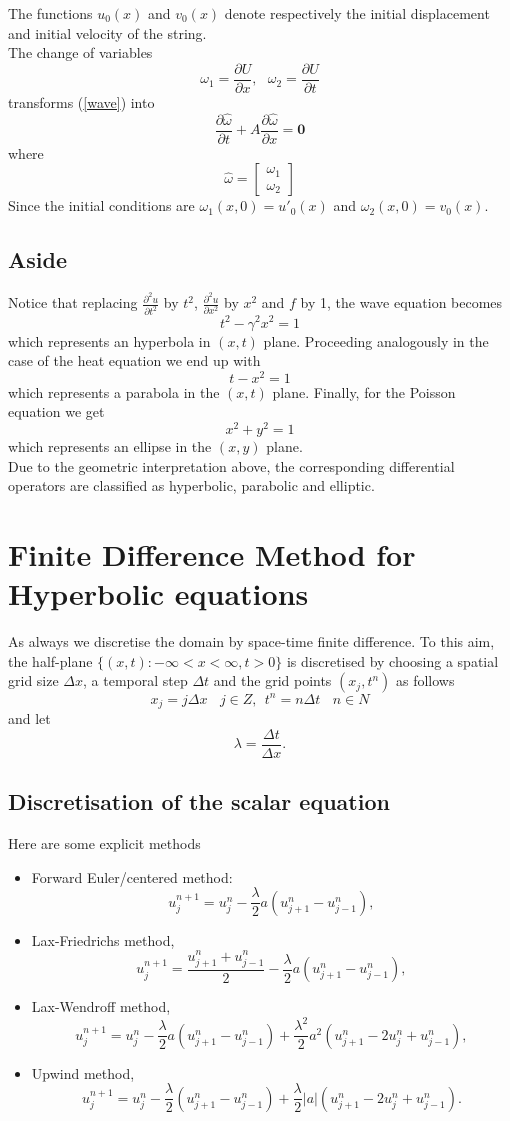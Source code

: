 The functions $u_0(x)$ and $v_0(x)$ denote respectively the initial displacement and initial velocity of the string.\\
The change of variables
\[\omega_1=\frac{\partial U}{\partial x}, \ \ \ \omega_2 =\frac{\partial U}{\partial t} \]
transforms (\ref{wave}) into 
\[
\frac{\partial \hat{\omega}}{\partial t} +A\frac{\partial \hat{\omega}}{\partial x}= \mathbf{0}
\]
where
\[\hat{\omega}=\left[\begin{array}{c}\omega_1\\ \omega_2\end{array} \right] \]
Since the initial conditions are $\omega_1(x,0)=u'_0(x)$ and $\omega_2(x,0)=v_0(x)$.\\
\subsection*{Aside}
Notice that replacing $\frac{\partial^2 u}{\partial t^2}$ by $t^2$, $\frac{\partial^2u}{\partial x^2}$ by $x^2$ and $f$ by 1, the wave equation becomes
\[t^2-\gamma^2 x^2=1 \]
which represents an hyperbola in $(x,t)$ plane. Proceeding analogously in the case
of the heat equation we end up with 
\[t-x^2=1 \]
which represents a parabola in the $(x,t)$ plane. Finally, for the Poisson
equation we get
\[x^2+y^2=1 \]
which represents an ellipse in the $(x,y)$ plane.\\
Due to the geometric interpretation above, the corresponding differential
operators are classified as hyperbolic, parabolic and elliptic.
\section{Finite Difference Method for Hyperbolic equations}
As always we discretise the domain by space-time finite difference.  To this aim,
the half-plane $\{(x,t): -\infty <x<\infty, t>0 \}$ is discretised by choosing
a spatial grid size $\Delta x$, a temporal step $\Delta t$ and the grid
points $(x_j,t^n)$ as follows
\[x_j=j\Delta x  \ \ \ \ j \in Z, \ \ t^n=n\Delta t \ \ \ \ n \in N \]
and let 
\[\lambda =\frac{\Delta t}{\Delta x}. \]
\subsection{Discretisation of the scalar equation }
Here are some explicit methods 
\begin{itemize}
\item
Forward Euler/centered method:
\[ u^{n+1}_j=u^{n}_{j}-\frac{\lambda}{2}a(u^{n}_{j+1}-u^{n}_{j-1}),\]
\item
Lax-Friedrichs method,
\[ u^{n+1}_j=\frac{u^{n}_{j+1}+u_{j-1}^n}{2}-\frac{\lambda}{2}a(u^{n}_{j+1}-u^{n}_{j-1}),\]
\item
Lax-Wendroff method,
\[ u^{n+1}_j=u^{n}_{j}-\frac{\lambda}{2}a(u^{n}_{j+1}-u^{n}_{j-1})+\frac{\lambda^2}{2}a^2(u^{n}_{j+1}-2u_{j}^n+u^{n}_{j-1}),\]
\item
Upwind method,
\[ u^{n+1}_j=u^{n}_{j}-\frac{\lambda}{2}(u^{n}_{j+1}-u^{n}_{j-1})+\frac{\lambda}{2}|a|(u^{n}_{j+1}-2u_{j}^n+u^{n}_{j-1}).
\]
\end{itemize}

